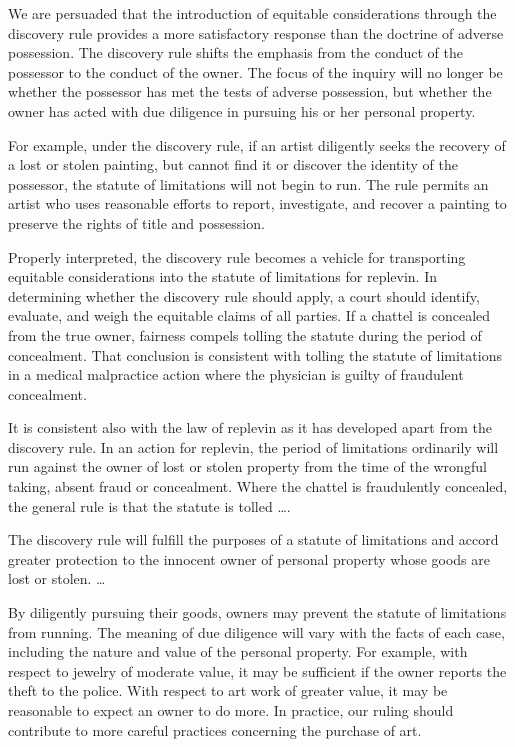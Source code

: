 We are persuaded that the introduction of equitable considerations through the
discovery rule provides a more satisfactory response than the doctrine of
adverse possession. The discovery rule shifts the emphasis from the conduct of
the possessor to the conduct of the owner. The focus of the inquiry will no
longer be whether the possessor has met the tests of adverse possession, but
whether the owner has acted with due diligence in pursuing his or her personal
property.

For example, under the discovery rule, if an artist diligently seeks the
recovery of a lost or stolen painting, but cannot find it or discover the
identity of the possessor, the statute of limitations will not begin to run.
The rule permits an artist who uses reasonable efforts to report, investigate,
and recover a painting to preserve the rights of title and possession.

Properly interpreted, the discovery rule becomes a vehicle for transporting
equitable considerations into the statute of limitations for replevin. In
determining whether the discovery rule should apply, a court should identify,
evaluate, and weigh the equitable claims of all parties. If a chattel is
concealed from the true owner, fairness compels tolling the statute during the
period of concealment. That conclusion is consistent with tolling the statute
of limitations in a medical malpractice action where the physician is guilty of
fraudulent concealment.

It is consistent also with the law of replevin as it has developed apart from
the discovery rule. In an action for replevin, the period of limitations
ordinarily will run against the owner of lost or stolen property from the time
of the wrongful taking, absent fraud or concealment. Where the chattel is
fraudulently concealed, the general rule is that the statute is tolled \ldots.

The discovery rule will fulfill the purposes of a statute of limitations and
accord greater protection to the innocent owner of personal property whose
goods are lost or stolen. \ldots

By diligently pursuing their goods, owners may prevent the statute of
limitations from running. The meaning of due diligence will vary with the facts
of each case, including the nature and value of the personal property. For
example, with respect to jewelry of moderate value, it may be sufficient if the
owner reports the theft to the police. With respect to art work of greater
value, it may be reasonable to expect an owner to do more. In practice, our
ruling should contribute to more careful practices concerning the purchase of
art.

